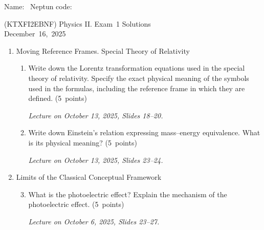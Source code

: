 \documentclass[a4paper,12pt]{letter}
\begin{document}
Name: \hrulefill\ Neptun code: \hrulefill

\bigskip

\begin{center}
(KTXFI2EBNF) Physics II. Exam~1 Solutions\\
December~16,~2025 
\end{center}

\bigskip
 
\begin{enumerate}[label=\Roman*.]
   
\item Moving Reference Frames. Special Theory of Relativity

\begin{enumerate}[label=\arabic*.]
\setcounter{enumii}{0} %


\item  Write down the Lorentz transformation equations used in the special theory of relativity. Specify the exact physical meaning of the symbols used in the formulas, including the reference frame in which they are defined. \hfill (5~points)

\smallskip
\textit{Lecture on October 13, 2025, Slides 18--20.}
  
\item Write down Einstein’s relation expressing mass–energy equivalence. What is its physical meaning? \hfill (5~points)

\smallskip
\textit{Lecture on October 13, 2025, Slides 23--24.}
 
\end{enumerate}


\item Limits of the Classical Conceptual Framework

\begin{enumerate}[label=\arabic*.]
\setcounter{enumii}{2} %
  
\item What is the photoelectric effect? Explain the mechanism of the photoelectric effect. \hfill (5~points)

\smallskip
\textit{Lecture on October 6, 2025, Slides 23--27.}
  

\end{enumerate}
\end{enumerate}
\end{document}
